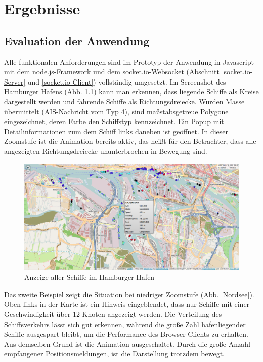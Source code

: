 \chapter{Ergebnisse}

\section{Evaluation der Anwendung}\label{Evaluation der Anwendung}
Alle funktionalen Anforderungen sind im Prototyp der Anwendung in Javascript mit dem node.js-Framework und dem socket.io-Websocket (Abschnitt \ref{socket.io-Server} und \ref{socket.io-Client}) vollständig umgesetzt. Im Screenshot des Hamburger Hafens (Abb. \ref{Hafen Hamburg}) kann man erkennen, dass liegende Schiffe als Kreise dargestellt werden und fahrende Schiffe als Richtungsdreiecke. Wurden Masse übermittelt (AIS-Nachricht vom Typ 4), sind maßstabsgetreue Polygone eingezeichnet, deren Farbe den Schiffstyp kennzeichnet.
Ein Popup mit Detailinformationen zum dem Schiff links daneben ist geöffnet. In dieser Zoomstufe ist die Animation bereits aktiv, das heißt für den Betrachter, dass alle angezeigten Richtungsdreiecke ununterbrochen in Bewegung sind.

\begin {figure}[H]
\begin{center}
  \includegraphics[width=6in]{images/Hamburg.png}
\end{center}
\caption{Anzeige aller Schiffe im Hamburger Hafen}
\label{Hafen Hamburg}
\end {figure}
Das zweite Beispiel zeigt die Situation bei niedriger Zoomstufe (Abb. \ref{Nordsee}). Oben links in der Karte ist ein Hinweis eingeblendet, dass nur Schiffe mit einer Geschwindigkeit über 12 Knoten angezeigt werden. Die Verteilung des Schiffsverkehrs lässt sich gut erkennen, während die große Zahl hafenliegender Schiffe ausgespart bleibt, um die Performance des Browser-Clients zu erhalten. Aus demselben Grund ist die Animation ausgeschaltet. Durch die große Anzahl empfangener Positionsmeldungen, ist die Darstellung trotzdem bewegt.

